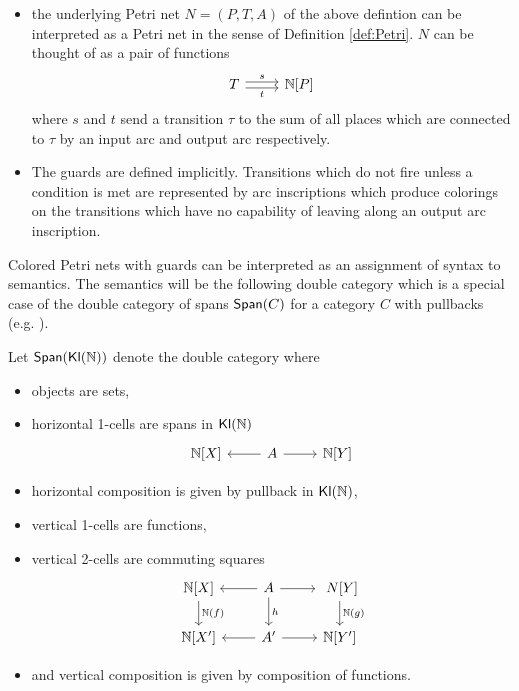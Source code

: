 \begin{itemize} 
    \item the underlying Petri net $N=(P, T, A)$ of the above defintion can be interpreted as a Petri net in the sense of Definition \ref{def:Petri}. $N$ can be thought of as a pair of functions
    \[ \begin{tikzcd}T \ar[r, shift left=.5ex, "s"] \ar[r, shift right=.5ex, "t", swap] & \N[P] \end{tikzcd}\]
    where $s$ and $t$ send a transition $\tau$ to the sum of all places which are connected to $\tau$ by an input arc and output arc respectively.
    \item The guards are defined implicitly. Transitions which do not fire unless a condition is met are represented by arc inscriptions which produce colorings on the transitions which have no capability of leaving along an output arc inscription.
\end{itemize}
Colored Petri nets with guards can be interpreted as an assignment of syntax to semantics. The semantics will be the following double category which is a special case of the double category of spans $\mathsf{Span}(C)$ for a category $C$ with pullbacks (e.g. \cite[\S 3]{dawson2010span}).
\begin{prop}
Let $\mathsf{Span}(\mathsf{Kl}(\mathbb{N}))$ denote the double category where 
\begin{itemize}
\item objects are sets,
\item horizontal 1-cells are spans in $\mathsf{Kl}(\mathbb{N})$\[\begin{tikzcd}
    \N[X] &\ar[l]  A \ar[r] &\N[Y]
\end{tikzcd}\]
\item horizontal composition is given by pullback in $\mathsf{Kl}(\mathbb{N})$,
\item vertical 1-cells are functions,
\item vertical 2-cells are commuting squares
\[\begin{tikzcd}
    \N[X] \ar[d,"\N(f)"] &\ar[l]  A\ar[d,"h"] \ar[r] &\ N[Y] \ar[d,"\N(g)"]\\
    \N[X'] & \ar[l] A' \ar[r] & \N[Y']
\end{tikzcd}\]
\item and vertical composition is given by composition of functions.
\end{itemize}
\end{prop}
